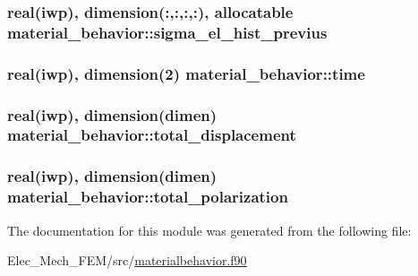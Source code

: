 \subsubsection[{sigma\+\_\+el\+\_\+hist\+\_\+previus}]{\setlength{\rightskip}{0pt plus 5cm}real(iwp), dimension(\+:,\+:,\+:,\+:), allocatable material\+\_\+behavior\+::sigma\+\_\+el\+\_\+hist\+\_\+previus}\label{classmaterial__behavior_ad3264258813ff10e3c1f1ba6a633583b}
\hypertarget{classmaterial__behavior_a4a0c3fd6ab8dc8bc3b46d051187e0fde}{}
\subsubsection[{time}]{\setlength{\rightskip}{0pt plus 5cm}real(iwp), dimension(2) material\+\_\+behavior\+::time}\label{classmaterial__behavior_a4a0c3fd6ab8dc8bc3b46d051187e0fde}
\hypertarget{classmaterial__behavior_ace487f4e09f47f8f9cf484ca0ad22b69}{}
\subsubsection[{total\+\_\+displacement}]{\setlength{\rightskip}{0pt plus 5cm}real(iwp), dimension(dimen) material\+\_\+behavior\+::total\+\_\+displacement}\label{classmaterial__behavior_ace487f4e09f47f8f9cf484ca0ad22b69}
\hypertarget{classmaterial__behavior_a52ff28207d80e56f256a5430e2179f3d}{}
\subsubsection[{total\+\_\+polarization}]{\setlength{\rightskip}{0pt plus 5cm}real(iwp), dimension(dimen) material\+\_\+behavior\+::total\+\_\+polarization}\label{classmaterial__behavior_a52ff28207d80e56f256a5430e2179f3d}


The documentation for this module was generated from the following file\+:\begin{DoxyCompactItemize}
\item 
Elec\+\_\+\+Mech\+\_\+\+F\+E\+M/src/\hyperlink{materialbehavior_8f90}{materialbehavior.\+f90}\end{DoxyCompactItemize}
